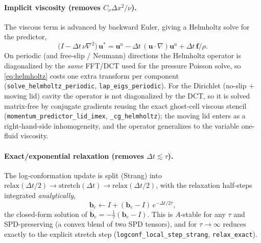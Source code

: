 \documentclass[11pt]{article}
\newcommand{\uv}{\bm{u}}
\newcommand{\bten}{\bm{b}}
\begin{document}
\paragraph{Implicit viscosity (removes $C_\nu\Delta x^2/\nu$).}
The viscous term is advanced by backward Euler, giving a Helmholtz solve for the
predictor,
\begin{equation}
\bigl(I-\Delta t\,\nu\nabla^2\bigr)\,\uv^{*}
   = \uv^{n} - \Delta t\,(\uv\!\cdot\!\nabla)\uv^{n} + \Delta t\,\bm f/\rho .
\label{eq:helmholtz}
\end{equation}
On periodic (and free-slip / Neumann) directions the Helmholtz operator is
diagonalized by the \emph{same} FFT/DCT used for the pressure Poisson solve, so
\eqref{eq:helmholtz} costs one extra transform per component
(\texttt{solve\_helmholtz\_periodic}, \texttt{lap\_eigs\_periodic}). For the
Dirichlet (no-slip $+$ moving lid) cavity the operator is not diagonalized by the DCT,
so it is solved matrix-free by conjugate gradients reusing the exact ghost-cell viscous
stencil (\texttt{momentum\_predictor\_lid\_imex}, \texttt{\_cg\_helmholtz}); the moving
lid enters as a right-hand-side inhomogeneity, and the operator generalizes to the
variable one-fluid viscosity.

\paragraph{Exact/exponential relaxation (removes $\Delta t\lesssim\tau$).}
The log-conformation update is split (Strang) into
$\text{relax}(\Delta t/2)\!\to\!\text{stretch}(\Delta t)\!\to\!\text{relax}(\Delta t/2)$,
with the relaxation half-steps integrated \emph{analytically},
\begin{equation}
\bten_e \leftarrow I + (\bten_e-I)\,e^{-\Delta t/2\tau},
\label{eq:relaxexact}
\end{equation}
the closed-form solution of $\dot{\bten}_e=-\tfrac1\tau(\bten_e-I)$. This is
$A$-stable for any $\tau$ and SPD-preserving (a convex blend of two SPD tensors), and
for $\tau\to\infty$ reduces exactly to the explicit stretch step
(\texttt{logconf\_local\_step\_strang}, \texttt{relax\_exact}).
\end{document}
